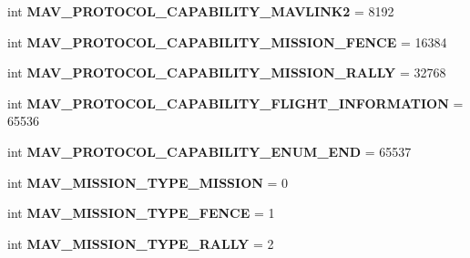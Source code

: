 \begin{DoxyCompactItemize}
int {\bfseries M\+A\+V\+\_\+\+P\+R\+O\+T\+O\+C\+O\+L\+\_\+\+C\+A\+P\+A\+B\+I\+L\+I\+T\+Y\+\_\+\+M\+A\+V\+L\+I\+N\+K2} = 8192
\item 
\mbox{\label{namespacepymavlink_1_1dialects_1_1v10_ad1ae26720a4df204bb366b2308d3f723}} 
int {\bfseries M\+A\+V\+\_\+\+P\+R\+O\+T\+O\+C\+O\+L\+\_\+\+C\+A\+P\+A\+B\+I\+L\+I\+T\+Y\+\_\+\+M\+I\+S\+S\+I\+O\+N\+\_\+\+F\+E\+N\+CE} = 16384
\item 
\mbox{\label{namespacepymavlink_1_1dialects_1_1v10_a39de01ad77695fb7e09ddd83d9910005}} 
int {\bfseries M\+A\+V\+\_\+\+P\+R\+O\+T\+O\+C\+O\+L\+\_\+\+C\+A\+P\+A\+B\+I\+L\+I\+T\+Y\+\_\+\+M\+I\+S\+S\+I\+O\+N\+\_\+\+R\+A\+L\+LY} = 32768
\item 
\mbox{\label{namespacepymavlink_1_1dialects_1_1v10_a55219b418d46a50c9c30f5a434bb6dae}} 
int {\bfseries M\+A\+V\+\_\+\+P\+R\+O\+T\+O\+C\+O\+L\+\_\+\+C\+A\+P\+A\+B\+I\+L\+I\+T\+Y\+\_\+\+F\+L\+I\+G\+H\+T\+\_\+\+I\+N\+F\+O\+R\+M\+A\+T\+I\+ON} = 65536
\item 
\mbox{\label{namespacepymavlink_1_1dialects_1_1v10_aecc19d8547d6bf3a99181e995e5e130a}} 
int {\bfseries M\+A\+V\+\_\+\+P\+R\+O\+T\+O\+C\+O\+L\+\_\+\+C\+A\+P\+A\+B\+I\+L\+I\+T\+Y\+\_\+\+E\+N\+U\+M\+\_\+\+E\+ND} = 65537
\item 
\mbox{\label{namespacepymavlink_1_1dialects_1_1v10_a9e1f33b4b8a3c25316383f0bcf70f0cd}} 
int {\bfseries M\+A\+V\+\_\+\+M\+I\+S\+S\+I\+O\+N\+\_\+\+T\+Y\+P\+E\+\_\+\+M\+I\+S\+S\+I\+ON} = 0
\item 
\mbox{\label{namespacepymavlink_1_1dialects_1_1v10_a49774df2500b4b128f02064d94f5b217}} 
int {\bfseries M\+A\+V\+\_\+\+M\+I\+S\+S\+I\+O\+N\+\_\+\+T\+Y\+P\+E\+\_\+\+F\+E\+N\+CE} = 1
\item 
\mbox{\label{namespacepymavlink_1_1dialects_1_1v10_abe07d3e17f981552d57a70e9e7a9e25f}} 
int {\bfseries M\+A\+V\+\_\+\+M\+I\+S\+S\+I\+O\+N\+\_\+\+T\+Y\+P\+E\+\_\+\+R\+A\+L\+LY} = 2
\item 
\mbox{\label{namespacepymavlink_1_1dialects_1_1v10_a562719ae0c317dd5164b5f2ac4020155}} 

\end{DoxyCompactItemize}
